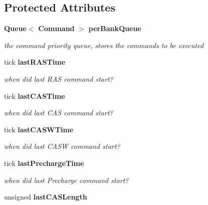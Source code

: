 \subsection*{Protected Attributes}
\begin{CompactItemize}
\item 
{\bf Queue}$<$ {\bf Command} $>$ {\bf perBankQueue}\label{class_d_r_a_msim_i_i_1_1_bank_6e2ca8ec2f63931e083a03f8143684a2}

\begin{CompactList}\small\item\em the command priority queue, stores the commands to be executed \item\end{CompactList}\item 
tick {\bf lastRASTime}\label{class_d_r_a_msim_i_i_1_1_bank_ae46b468fcd2d6357a3cfb3345752393}

\begin{CompactList}\small\item\em when did last RAS command start? \item\end{CompactList}\item 
tick {\bf lastCASTime}\label{class_d_r_a_msim_i_i_1_1_bank_9638ce1c0abbed003ee7e015cf719654}

\begin{CompactList}\small\item\em when did last CAS command start? \item\end{CompactList}\item 
tick {\bf lastCASWTime}\label{class_d_r_a_msim_i_i_1_1_bank_73c5d235d450948bc2dde4001a2f00d6}

\begin{CompactList}\small\item\em when did last CASW command start? \item\end{CompactList}\item 
tick {\bf lastPrechargeTime}\label{class_d_r_a_msim_i_i_1_1_bank_cfa7062dc21939cca1cd738f9067dd02}

\begin{CompactList}\small\item\em when did last Precharge command start? \item\end{CompactList}\item 
unsigned {\bf lastCASLength}\label{class_d_r_a_msim_i_i_1_1_bank_83398f833decb4c62bc2217370d5ba0b}


\end{CompactItemize}
